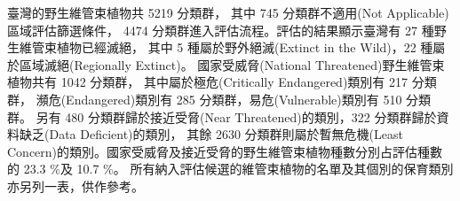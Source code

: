 臺灣的野生維管束植物共 5219 分類群，
其中 745 分類群不適用(Not Applicable)區域評估篩選條件，
4474 分類群進入評估流程。評估的結果顯示臺灣有 27 種野生維管束植物已經滅絕，
其中 5 種屬於野外絕滅(Extinct in the Wild)，22 種屬於區域滅絕(Regionally Extinct)。
國家受威脅(National Threatened)野生維管束植物共有 1042 分類群，
其中屬於極危(Critically Endangered)類別有 217 分類群，
瀕危(Endangered)類別有 285 分類群，易危(Vulnerable)類別有 510 分類群。
另有 480 分類群歸於接近受脅(Near Threatened)的類別，322 分類群歸於資料缺乏(Data Deficient)的類別，
其餘 2630 分類群則屬於暫無危機(Least Concern)的類別。國家受威脅及接近受脅的野生維管束植物種數分別占評估種數的 23.3 \%及 10.7 \%。
所有納入評估候選的維管束植物的名單及其個別的保育類別亦另列一表，供作參考。
